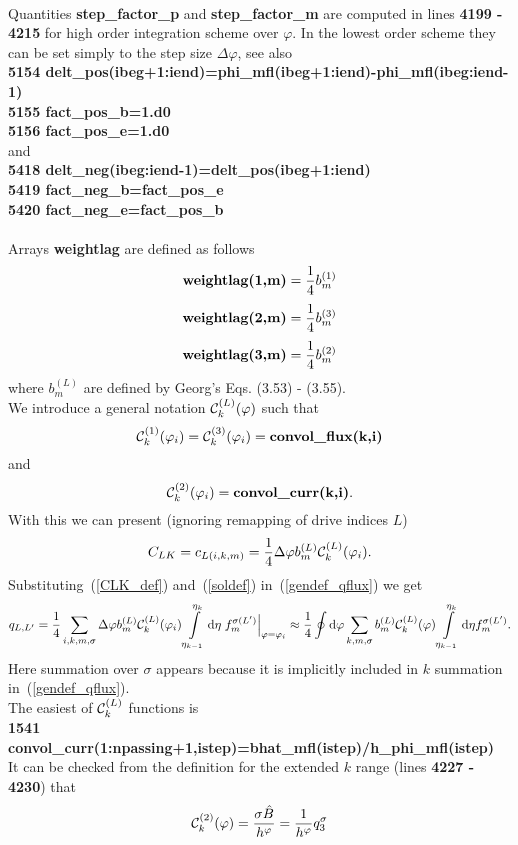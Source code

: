 \documentclass[preprint,prb,aps]{revtex4-1}
\newcommand{\be}[1]{\begin{equation} \label{#1}}
\newcommand{\ee}{\end{equation}}
\newcommand{\eq}[1]{(\ref{#1})}
\newcommand{\rd}{{\rm d}}
\begin{document}
\\
Quantities {\bf step\_factor\_p} and {\bf step\_factor\_m} are computed in lines {\bf 4199 - 4215}
for high order integration scheme over $\varphi$. In the lowest order scheme they can be set simply to
the step size $\Delta \varphi$, see also
\\
{\bf
5154   delt\_pos(ibeg+1:iend)=phi\_mfl(ibeg+1:iend)-phi\_mfl(ibeg:iend-1) \\
5155   fact\_pos\_b=1.d0 \\
5156   fact\_pos\_e=1.d0
}
\\
and
\\
{\bf
5418   delt\_neg(ibeg:iend-1)=delt\_pos(ibeg+1:iend) \\
5419   fact\_neg\_b=fact\_pos\_e \\
5420   fact\_neg\_e=fact\_pos\_b \\
}
\\
Arrays {\bf weightlag} are defined as follows
$$
\mbox{\bf weightlag(1,m)}=\frac{1}{4} b^{(1)}_m
$$
$$
\mbox{\bf weightlag(2,m)}=\frac{1}{4} b^{(3)}_m
$$
$$
\mbox{\bf weightlag(3,m)}=\frac{1}{4} b^{(2)}_m
$$
where $b^{(L)}_m$ are defined by Georg's Eqs. (3.53) - (3.55).
\\
We introduce a general notation ${\cal C}_k^{(L)}(\varphi)$ such that
$$
{\cal C}_k^{(1)}(\varphi_i)={\cal C}_k^{(3)}(\varphi_i)=\mbox{\bf convol\_flux(k,i)}
$$
and
$$
{\cal C}_k^{(2)}(\varphi_i)=\mbox{\bf convol\_curr(k,i)}.
$$
With this we can present (ignoring remapping of drive indices $L$)
\be{CLK_def}
C_{LK}=c_{L(i,k,m)}=\frac{1}{4}\Delta\varphi b^{(L)}_m {\cal C}_k^{(L)}(\varphi_i).
\ee
Substituting~\eq{CLK_def} and~\eq{soldef} in~\eq{gendef_qflux} we get
\be{approxqflux}
q_{L,L^\prime} = \frac{1}{4}\sum_{i,k,m,\sigma}\Delta\varphi b^{(L)}_m {\cal C}_k^{(L)}(\varphi_i)
\int\limits_{\eta_{k-1}}^{\eta_k}\rd \eta \left .f^{\sigma(L^\prime)}_m\right|_{\varphi=\varphi_i}
\approx
\frac{1}{4} \oint \rd \varphi \sum_{k,m,\sigma} b^{(L)}_m {\cal C}_k^{(L)}(\varphi)
\int\limits_{\eta_{k-1}}^{\eta_k}\rd \eta f^{\sigma(L^\prime)}_m .
\ee
Here summation over $\sigma$ appears because it is implicitly included in $k$ summation in~\eq{gendef_qflux}.
\\
The easiest of ${\cal C}_k^{(L)}$ functions is
\\
{\bf
1541     convol\_curr(1:npassing+1,istep)=bhat\_mfl(istep)/h\_phi\_mfl(istep)
}
\\
It can be checked from the definition for the extended $k$ range (lines {\bf 4227 - 4230}) that
$$
{\cal C}_k^{(2)}(\varphi)=\frac{\sigma \hat B}{h^\varphi}=\frac{1}{h^\varphi} q_3^\sigma
$$
\end{document}
